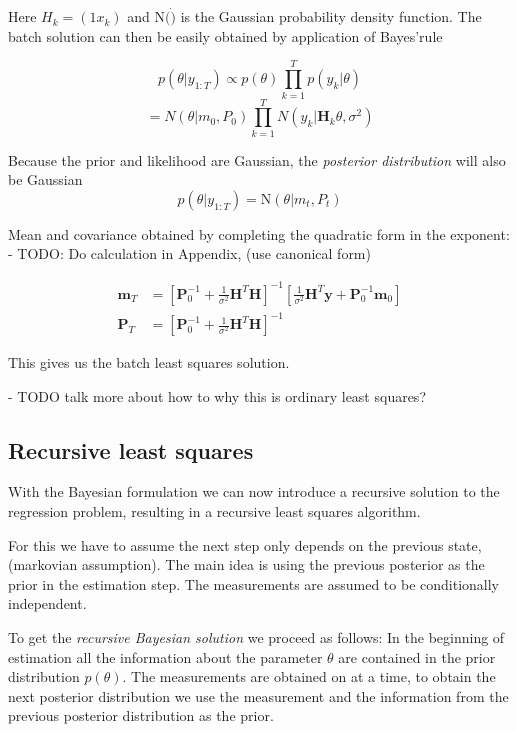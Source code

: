 Here $H_k = (1 x_k)$ and N$(\dot)$ is the Gaussian probability density function.
The batch solution can then be easily obtained by application of Bayes'rule

$$ p(\theta | y_{1:T})  \propto p(\theta) \prod^T_{k=1} p (y_k | \theta) $$
$$ = N(\theta | m_0, P_0) \prod^T_{k=1} N(y_k | \textbf{H}_k \theta, \sigma^2) $$

Because the prior and likelihood are Gaussian, the \textit{posterior distribution}
will also be Gaussian
$$ p(\theta | y_{1:T}) = \text{N}(\theta | m_t, P_t) $$

Mean and covariance obtained by completing the quadratic form in the exponent:
- TODO: Do calculation in Appendix, (use canonical form)

\begin{align}
  \mathbf{m}_T &= \left[ \mathbf{P}^{-1}_0 + \frac{1}{\sigma^2} \mathbf{H}^T \mathbf{H}
                 \right]^{-1} \left[\frac{1}{\sigma^2} \mathbf{H}^T \mathbf{y} +
  \mathbf{P}^{-1}_0 \mathbf{m}_0 \right] \\
  \mathbf{P}_T &= \left[\mathbf{P}_0^{-1} + \frac{1}{\sigma^2} \mathbf{H}^T \mathbf{H}
                 \right]^{-1}
\end{align}

This gives us the batch least squares solution.

- TODO talk more about how to why this is ordinary least squares?

\subsection{Recursive least squares} \label{RLS}
With the Bayesian formulation we can now  introduce a recursive
solution to the regression problem, resulting in a recursive least squares
algorithm.

For this we have to assume the next step only
depends on the previous state, (markovian assumption).
The main idea is using the previous posterior as the prior in the estimation
step.
The measurements are assumed to be conditionally independent.

To get the \textit{recursive Bayesian solution} we proceed as follows:
In the beginning of estimation all the information about the parameter $\theta$
are contained in the prior distribution $p(\theta)$.
The measurements are obtained on at a time, to
obtain the next posterior distribution we use the measurement and the information
from the previous posterior distribution as the prior.

